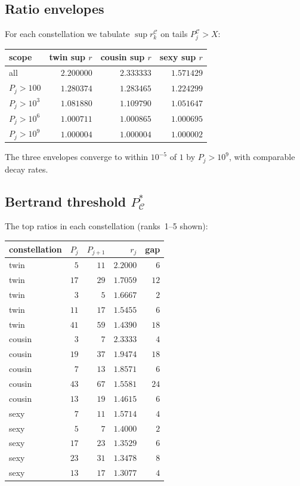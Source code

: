 \documentclass[11pt]{article}
\begin{document}
\subsection{Ratio envelopes}

For each constellation we tabulate $\sup r^{\mathcal{C}}_k$ on tails
$P^{\mathcal{C}}_j>X$:

\begin{center}
\begin{tabular}{lrrr}
\toprule
scope & twin sup $r$ & cousin sup $r$ & sexy sup $r$ \\
\midrule
all & $2.200000$ & $2.333333$ & $1.571429$ \\
$P_j>100$ & $1.280374$ & $1.283465$ & $1.224299$ \\
$P_j>10^3$ & $1.081880$ & $1.109790$ & $1.051647$ \\
$P_j>10^6$ & $1.000711$ & $1.000865$ & $1.000695$ \\
$P_j>10^9$ & $1.000004$ & $1.000004$ & $1.000002$ \\
\bottomrule
\end{tabular}
\end{center}

The three envelopes converge to within $10^{-5}$ of $1$ by
$P_j>10^9$, with comparable decay rates.

\subsection{Bertrand threshold $P^{*}_\mathcal{C}$}

The top ratios in each constellation (ranks~1--5 shown):

\begin{center}
\begin{tabular}{lrrrr}
\toprule
constellation & $P_j$ & $P_{j+1}$ & $r_j$ & gap \\
\midrule
twin & $5$ & $11$ & $2.2000$ & $6$ \\
twin & $17$ & $29$ & $1.7059$ & $12$ \\
twin & $3$ & $5$ & $1.6667$ & $2$ \\
twin & $11$ & $17$ & $1.5455$ & $6$ \\
twin & $41$ & $59$ & $1.4390$ & $18$ \\
\midrule
cousin & $3$ & $7$ & $2.3333$ & $4$ \\
cousin & $19$ & $37$ & $1.9474$ & $18$ \\
cousin & $7$ & $13$ & $1.8571$ & $6$ \\
cousin & $43$ & $67$ & $1.5581$ & $24$ \\
cousin & $13$ & $19$ & $1.4615$ & $6$ \\
\midrule
sexy & $7$ & $11$ & $1.5714$ & $4$ \\
sexy & $5$ & $7$ & $1.4000$ & $2$ \\
sexy & $17$ & $23$ & $1.3529$ & $6$ \\
sexy & $23$ & $31$ & $1.3478$ & $8$ \\
sexy & $13$ & $17$ & $1.3077$ & $4$ \\
\bottomrule
\end{tabular}
\end{center}
\end{document}
